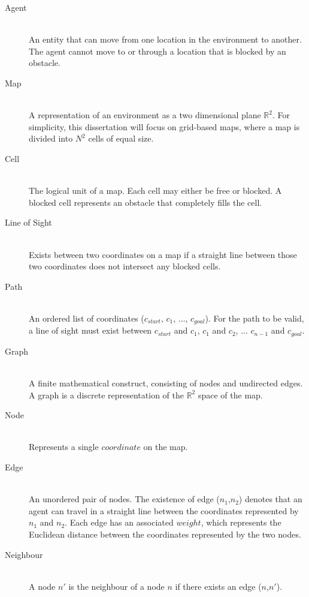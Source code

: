 \documentclass[12pt,notitlepage]{report}
\begin{document}
\begin{description}
\item[Agent] \hfill \\
  An entity that can move from one location in the environment to another. The agent cannot move to or through a location that is blocked by an obstacle.
  \item[Map] \hfill \\
  A representation of an environment as a two dimensional plane {$\mathbb{R}^{2}$}. For simplicity, this dissertation will focus on grid-based maps, where a map is divided into {$N^{2}$} cells of equal size. 
    \item[Cell] \hfill \\
  The logical unit of a map. Each cell may either be free or blocked. A blocked cell represents an obstacle that completely fills the cell.
  \item[Line of Sight] \hfill \\
  Exists between two coordinates on a map if a straight line between those two coordinates does not intersect any blocked cells.
   \item[Path] \hfill \\
  An ordered list of coordinates ({$c_{start}$}, {$c_{1}$}, ..., {$c_{goal}$}). For the path to be valid, a line of sight must exist between {$c_{start}$} and {$c_{1}$}, {$c_{1}$} and {$c_{2}$}, ... {$c_{n-1}$} and {$c_{goal}$}.
  \item[Graph] \hfill \\
  A finite mathematical construct, consisting of nodes and undirected edges. A graph is a discrete representation of the {$\mathbb{R}^{2}$} space of the map.
  \item[Node] \hfill \\
  Represents a single $coordinate$ on the map.
  \item[Edge] \hfill \\
  An unordered pair of nodes. The existence of edge ({$n_{1}$},{$n_{2}$}) denotes that an agent can travel in a straight line between the coordinates represented by {$n_{1}$} and {$n_{2}$}. Each edge has an associated $weight$, which represents the Euclidean distance between the coordinates represented by the two nodes.
    \item[Neighbour] \hfill \\
    A node {$n'$} is the neighbour of a node {$n$} if there exists an edge ({$n$},{$n'$}).
  
\end{description}
\end{document}
